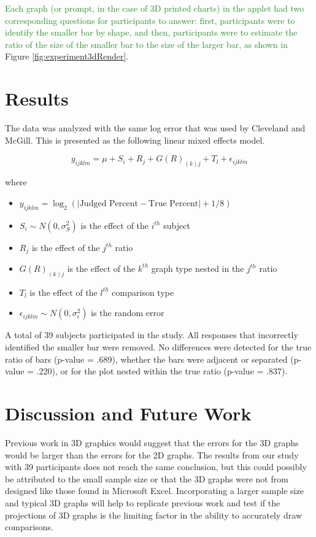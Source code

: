 \documentclass[letterpaper,inpress,dvipsnames]{jdsart}
\begin{document}
{\textcolor{ForestGreen}{Each graph (or prompt, in the case of 3D printed charts) in the applet had two corresponding questions for participants to answer: first, participants were to identify the smaller bar by shape, and then, participants were to estimate the ratio of the size of the smaller bar to the size of the larger bar, as shown in}} Figure \ref{fig:experiment3dRender}.

\hypertarget{results}{%
\section{Results}\label{results}}

The data was analyzed with the same log error that was used by Cleveland and McGill. This is presented as the following linear mixed effects model.

\[y_{ijklm}=\mu+S_i+R_j+G(R)_{(k)j}+T_l+\epsilon_{ijklm}\]

\noindent where

\begin{itemize}
\item
  \(y_{ijklm}=\log_2(|\text{Judged Percent} - \text{True Percent}|+1/8)\)
\item
  \(S_i\sim N(0,\sigma^2_S)\) is the effect of the \(i^{th}\) subject
\item
  \(R_j\) is the effect of the \(j^{th}\) ratio
\item
  \(G(R)_{(k)j}\) is the effect of the \(k^{th}\) graph type nested in the \(j^{th}\) ratio
\item
  \(T_l\) is the effect of the \(l^{th}\) comparison type
\item
  \(\epsilon_{ijklm}\sim N(0,\sigma^2_\epsilon)\) is the random error
\end{itemize}

A total of 39 subjects participated in the study.
All responses that incorrectly identified the smaller bar were removed.
No differences were detected for the true ratio of bars (p-value = .689), whether the bars were adjacent or separated (p-value = .220), or for the plot nested within the true ratio (p-value = .837).

\hypertarget{discussion-and-future-work}{%
\section{Discussion and Future Work}\label{discussion-and-future-work}}

Previous work in 3D graphics would suggest that the errors for the 3D graphs would be larger than the errors for the 2D graphs. The results from our study with 39 participants does not reach the same conclusion, but this could possibly be attributed to the small sample size or that the 3D graphs were not from designed like those found in Microsoft Excel. Incorporating a larger sample size and typical 3D graphs will help to replicate previous work and test if the projections of 3D graphs is the limiting factor in the ability to accurately draw comparisons.
\end{document}
